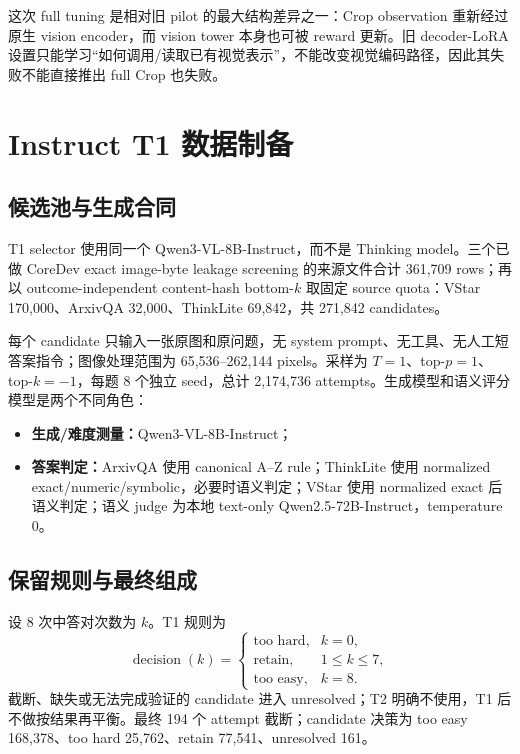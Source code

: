 \documentclass[UTF8,twocolumn,10pt,a4paper]{ctexart}
\begin{document}
这次 full tuning 是相对旧 pilot 的最大结构差异之一：Crop observation 重新经过原生 vision encoder，而 vision tower 本身也可被 reward 更新。旧 decoder-LoRA 设置只能学习“如何调用/读取已有视觉表示”，不能改变视觉编码路径，因此其失败不能直接推出 full Crop 也失败。

\section{Instruct T1 数据制备}

\subsection{候选池与生成合同}

T1 selector 使用同一个 Qwen3-VL-8B-Instruct，而不是 Thinking model。三个已做 CoreDev exact image-byte leakage screening 的来源文件合计 361,709 rows；再以 outcome-independent content-hash bottom-$k$ 取固定 source quota：VStar 170,000、ArxivQA 32,000、ThinkLite 69,842，共 271,842 candidates。

每个 candidate 只输入一张原图和原问题，无 system prompt、无工具、无人工短答案指令；图像处理范围为 65,536--262,144 pixels。采样为 $T=1$、top-$p=1$、top-$k=-1$，每题 8 个独立 seed，总计 2,174,736 attempts。生成模型和语义评分模型是两个不同角色：
\begin{itemize}
  \item \textbf{生成/难度测量：}Qwen3-VL-8B-Instruct；
  \item \textbf{答案判定：}ArxivQA 使用 canonical A--Z rule；ThinkLite 使用 normalized exact/numeric/symbolic，必要时语义判定；VStar 使用 normalized exact 后语义判定；语义 judge 为本地 text-only Qwen2.5-72B-Instruct，temperature 0。
\end{itemize}

\subsection{保留规则与最终组成}

设 8 次中答对次数为 $k$。T1 规则为
\begin{equation}
\operatorname{decision}(k)=
\begin{cases}
\text{too hard}, & k=0,\\
\text{retain}, & 1\le k\le7,\\
\text{too easy}, & k=8.
\end{cases}
\end{equation}
截断、缺失或无法完成验证的 candidate 进入 unresolved；T2 明确不使用，T1 后不做按结果再平衡。最终 194 个 attempt 截断；candidate 决策为 too easy 168,378、too hard 25,762、retain 77,541、unresolved 161。
\end{document}
